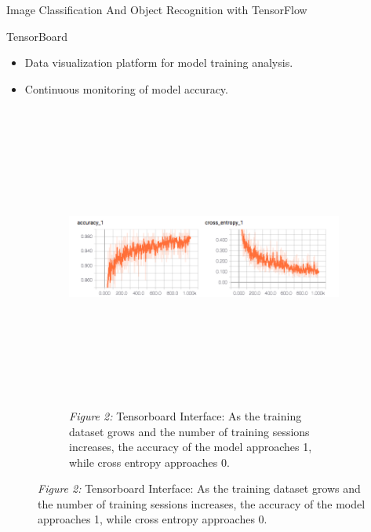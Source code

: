 \documentclass[22pt]{beamer}
\begin{document}
\begin{frame}[fragile]
\begin{textblock}{7.25}
\begin{block}{Image Classification And Object Recognition with TensorFlow}
\begin{figure}[htbp]
\begin{subfigure}{0.95\textwidth}
   \label{fig:softmax}
\end{subfigure}
\end{figure}
TensorBoard
\begin{itemize}
\item Data visualization platform for model training analysis.
\item Continuous monitoring of model accuracy.
\end{itemize}
\begin{figure}[htbp] %
\begin{subfigure}{0.95\textwidth}
   \centering
   \includegraphics[height=10cm]{interface.png}
   \caption*{\textit{Figure 2:} Tensorboard Interface:  As the training dataset grows and the number of training sessions increases, the accuracy of the model approaches 1, while cross entropy approaches 0.}
   \label{fig:interface}
\end{subfigure}
\end{figure}
\end{block}
\end{textblock}


\end{frame}
\end{document}
